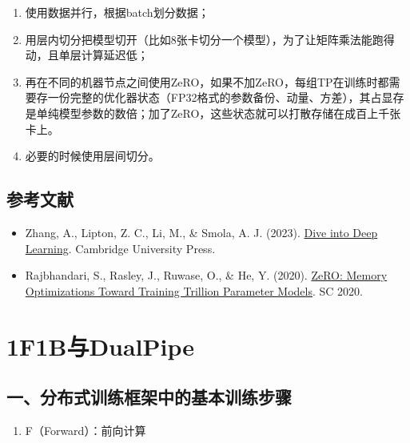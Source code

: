 \begin{enumerate}
\def\labelenumi{\arabic{enumi}.}
\item
  使用数据并行，根据batch划分数据；
\item
  用层内切分把模型切开（比如8张卡切分一个模型），为了让矩阵乘法能跑得动，且单层计算延迟低；
\item
  再在不同的机器节点之间使用ZeRO，如果不加ZeRO，每组TP在训练时都需要存一份完整的优化器状态（FP32格式的参数备份、动量、方差），其占显存是单纯模型参数的数倍；加了ZeRO，这些状态就可以打散存储在成百上千张卡上。
\item
  必要的时候使用层间切分。
\end{enumerate}

\hypertarget{ux53c2ux8003ux6587ux732e-36}{%
\subsection{参考文献}\label{ux53c2ux8003ux6587ux732e-36}}

\vspace{0.25em}
\begin{itemize}
\tightlist
\item
  Zhang, A., Lipton, Z. C., Li, M., \& Smola, A. J. (2023). \href{https://D2L.ai}{Dive into Deep Learning}. Cambridge University Press.
\item
  Rajbhandari, S., Rasley, J., Ruwase, O., \& He, Y. (2020). \href{https://arxiv.org/abs/1910.02054}{ZeRO: Memory Optimizations Toward Training Trillion Parameter Models}. SC 2020.
\end{itemize}

\clearpage

\hypertarget{f1bux4e0edualpipe}{%
\section{1F1B与DualPipe}\label{f1bux4e0edualpipe}}

\hypertarget{ux4e00ux5206ux5e03ux5f0fux8badux7ec3ux6846ux67b6ux4e2dux7684ux57faux672cux8badux7ec3ux6b65ux9aa4}{%
\subsection{一、分布式训练框架中的基本训练步骤}\label{ux4e00ux5206ux5e03ux5f0fux8badux7ec3ux6846ux67b6ux4e2dux7684ux57faux672cux8badux7ec3ux6b65ux9aa4}}

\begin{enumerate}
\def\labelenumi{\arabic{enumi}.}
\tightlist
\item
  F（Forward）：前向计算
\end{enumerate}


